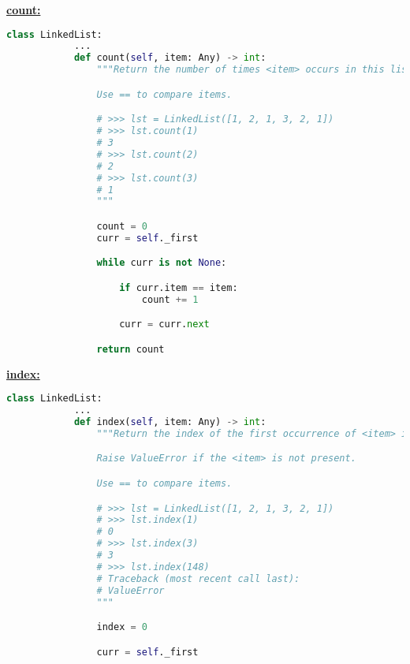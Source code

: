 \documentclass[12pt]{article}
\begin{document}
\begin{enumerate}[1.]
    \begin{mdframed}
        \underline{\textbf{count:}}

        \bigskip

        \begin{lstlisting}[language=python,caption={task\_1\_step\_2\_solution.py}]
        class LinkedList:
            ...
            def count(self, item: Any) -> int:
                """Return the number of times <item> occurs in this list.

                Use == to compare items.

                # >>> lst = LinkedList([1, 2, 1, 3, 2, 1])
                # >>> lst.count(1)
                # 3
                # >>> lst.count(2)
                # 2
                # >>> lst.count(3)
                # 1
                """

                count = 0
                curr = self._first

                while curr is not None:

                    if curr.item == item:
                        count += 1

                    curr = curr.next

                return count
        \end{lstlisting}

        \bigskip

        \underline{\textbf{index:}}

        \bigskip

        \begin{lstlisting}[language=python,caption={task\_1\_step\_2\_solution.py}]
        class LinkedList:
            ...
            def index(self, item: Any) -> int:
                """Return the index of the first occurrence of <item> in this list.

                Raise ValueError if the <item> is not present.

                Use == to compare items.

                # >>> lst = LinkedList([1, 2, 1, 3, 2, 1])
                # >>> lst.index(1)
                # 0
                # >>> lst.index(3)
                # 3
                # >>> lst.index(148)
                # Traceback (most recent call last):
                # ValueError
                """

                index = 0

                curr = self._first


\end{lstlisting}
\end{mdframed}
\end{enumerate}
\end{document}
